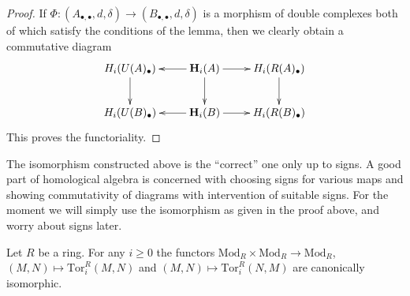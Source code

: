 \begin{proof}
\medskip\noindent
If $\Phi : (A_{\bullet,\bullet}, d, \delta)
\to (B_{\bullet,\bullet}, d, \delta)$ is a morphism
of double complexes both of which satisfy the conditions
of the lemma, then we clearly obtain a commutative
diagram
$$
\xymatrix{
H_i(U(A)_\bullet) \ar[d] &
\mathbf{H}_i(A) \ar[r] \ar[l] \ar[d] &
H_i(R(A)_\bullet) \ar[d] \cr
H_i(U(B)_\bullet) &
\mathbf{H}_i(B) \ar[r] \ar[l] &
H_i(R(B)_\bullet) \cr
}
$$
This proves the functoriality.
\end{proof}

\begin{remark}
\label{remark-signs-double-complex}
The isomorphism constructed above is the ``correct'' one only up to signs.
A good part of homological algebra is concerned with choosing signs for
various maps and showing commutativity of diagrams with intervention
of suitable signs. For the moment we will simply use the isomorphism
as given in the proof above, and worry about signs later.
\end{remark}

\begin{lemma}
\label{lemma-tor-left-right}
Let $R$ be a ring. For any $i \geq 0$ the functors
$\text{Mod}_R \times \text{Mod}_R \to \text{Mod}_R$,
$(M, N) \mapsto \text{Tor}_i^R(M,N)$ and
$(M, N) \mapsto \text{Tor}_i^R(N,M)$ are
canonically isomorphic.
\end{lemma}

